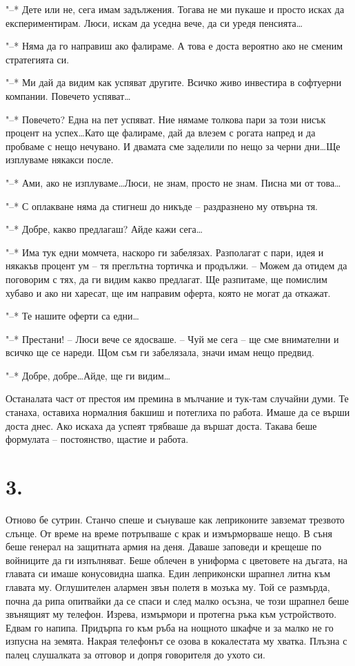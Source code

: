 \documentclass[ebook,openany,12pt]{memoir}
\begin{document}
"--* Дете или не, сега имам задължения. Тогава не ми пукаше и просто исках да експериментирам. Люси, искам да уседна вече, да си уредя пенсията\ldots

"--* Няма да го направиш ако фалираме. А това е доста вероятно ако не сменим стратегията си.

"--* Ми дай да видим как успяват другите. Всичко живо инвестира в софтуерни компании. Повечето успяват\ldots

"--* Повечето? Една на пет успяват. Ние нямаме толкова пари за този нисък процент на успех\ldots Като ще фалираме, дай да влезем с рогата напред и да пробваме с нещо нечувано. И двамата сме заделили по нещо за черни дни\ldots Ще изплуваме някакси после.

"--* Ами, ако не изплуваме\ldots Люси, не знам, просто не знам. Писна ми от това\ldots

"--* С оплакване няма да стигнеш до никъде – раздразнено му отвърна тя.

"--* Добре, какво предлагаш? Айде кажи сега\ldots

"--* Има тук едни момчета, наскоро ги забелязах. Разполагат с пари, идея и някакъв процент ум – тя преглътна тортичка и продължи. – Можем да отидем да поговорим с тях, да ги видим какво предлагат. Ще разпитаме, ще помислим хубаво и ако ни харесат, ще им направим оферта, която не могат да откажат.

"--* Те нашите оферти са едни\ldots

"--* Престани! – Люси вече се ядосваше. – Чуй ме сега – ще сме внимателни и всичко ще се нареди. Щом съм ги забелязала, значи имам нещо предвид. 

"--* Добре, добре\ldots Айде, ще ги видим\ldots

Останалата част от престоя им премина в мълчание и тук-там случайни думи. Те станаха, оставиха нормалния бакшиш и потеглиха по работа. Имаше да се върши доста днес. Ако искаха да успеят трябваше да вършат доста. Такава беше формулата – постоянство, щастие и работа.

\section*{3.}

Отново бе сутрин. Станчо спеше и сънуваше как леприконите завземат трезвото слънце. От време на време потръпваше с крак и измърморваше нещо. В съня беше генерал на защитната армия на деня. Даваше заповеди и крещеше по войниците да ги изпълняват. Беше облечен в униформа с цветовете на дъгата, на главата си имаше конусовидна шапка. Един леприконски шрапнел литна към главата му. Оглушителен алармен звън полетя в мозъка му. Той се размърда, почна да рипа опитвайки да се спаси и след малко осъзна, че този шрапнел беше звънящият му телефон. Изрева, измърмори и протегна ръка към устройството. Едвам го напипа. Придърпа го към ръба на нощното шкафче и за малко не го изпусна на земята. Накрая телефонът се озова в кокалестата му хватка. Плъзна с палец слушалката за отговор и допря говорителя до ухото си. 
\end{document}
